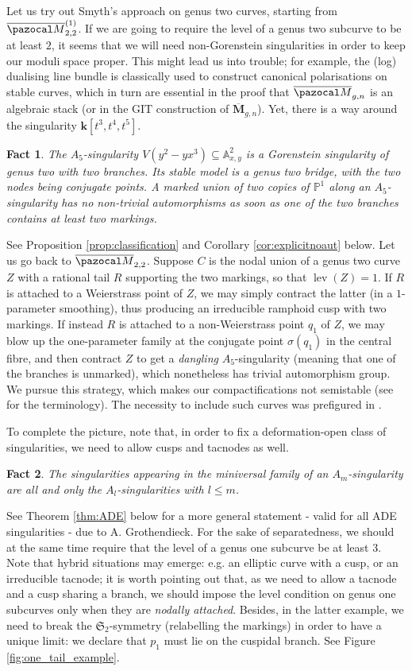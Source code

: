 \documentclass[11pt]{amsart}
\newcommand{\PP}{\mathbb P}
\renewcommand{\k}{\mathbf k}
\newcommand{\Aaff}{\mathbb A}
\newcommand{\oM}{\overline{\pazocal M}}
\newcommand{\lev}{\operatorname{lev}}
\theoremstyle{plain}
\newtheorem*{fact}{Fact}
\theoremstyle{definition}
\begin{document}
Let us try out Smyth's approach on genus two curves, starting from $\oM_{2,2}^{(1)}$. If we are going to require the level of a genus two subcurve to be at least $2$, it seems that we will need non-Gorenstein singularities in order to keep our moduli space proper. This might lead us into trouble; for example, the (log) dualising line bundle is classically used to construct canonical polarisations on stable curves, which in turn are essential in the proof that $\oM_{g,n}$ is an algebraic stack (or in the GIT construction of $\overline{\mathbf M}_{g,n}$). Yet, there is a way around the singularity $\k[t^3,t^4,t^5]$.
\begin{fact}
 The $A_5$-singularity $V(y^2-yx^3)\subseteq\Aaff^2_{x,y}$ is a Gorenstein singularity of genus two with two branches. Its stable model is a genus two bridge, with the two nodes being conjugate points. A marked union of two copies of $\PP^1$ along an $A_5$-singularity has no non-trivial automorphisms as soon as one of the two branches contains at least two markings.
\end{fact}
See Proposition \ref{prop:classification} and Corollary \ref{cor:explicitnoaut} below. Let us go back to $\oM_{2,2}$. Suppose $C$ is the nodal union of a genus two curve $Z$ with a rational tail $R$ supporting the two markings, so that $\lev(Z)=1$. If $R$ is attached to a Weierstrass point of $Z$, we may simply contract the latter (in a $1$-parameter smoothing), thus producing an irreducible ramphoid cusp with two markings. If instead $R$ is attached to a non-Weierstrass point $q_1$ of $Z$, we may blow up the one-parameter family at the conjugate point $\sigma(q_1)$ in the central fibre, and then contract $Z$ to get a \emph{dangling} $A_5$-singularity (meaning that one of the branches is unmarked), which nonetheless has trivial automorphism group. We pursue this strategy, which makes our compactifications not semistable (see \cite[Definition 1.2]{SMY-towards} for the terminology). The necessity to include such curves was prefigured in \cite{AFSGm}.

To complete the picture, note that, in order to fix a deformation-open class of singularities, we need to allow cusps and tacnodes as well.
\begin{fact}
 The singularities appearing in the miniversal family of an $A_m$-singularity are all and only the $A_l$-singularities with $l\leq m$.
\end{fact}
See Theorem \ref{thm:ADE} below for a more general statement - valid for all ADE singularities - due to A. Grothendieck. For the sake of separatedness, we should at the same time require that the level of a genus one subcurve be at least $3$. Note that hybrid situations may emerge: e.g. an elliptic curve with a cusp, or an irreducible tacnode; it is worth pointing out that, as we need to allow a tacnode and a cusp sharing a branch, we should impose the level condition on genus one subcurves only when they are \emph{nodally attached}. Besides, in the latter example, we need to break the $\mathfrak S_2$-symmetry (relabelling the markings) in order to have a unique limit: we declare that $p_1$ must lie on the cuspidal branch. See Figure \ref{fig:one_tail_example}.
\end{document}
